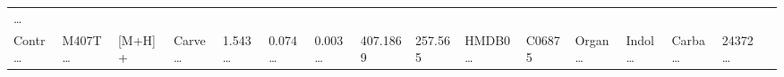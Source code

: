 \documentclass[
]{article}
\begin{document}
\begin{longtable}[]{@{}llllllllllllllll@{}}
\begin{minipage}[t]{0.02\columnwidth}
\ldots{}\strut
\end{minipage}\tabularnewline
\begin{minipage}[t]{0.04\columnwidth}\raggedright
Contr\ldots{}\strut
\end{minipage} & \begin{minipage}[t]{0.04\columnwidth}\raggedright
M407T\ldots{}\strut
\end{minipage} & \begin{minipage}[t]{0.04\columnwidth}\raggedright
{[}M+H{]}+\strut
\end{minipage} & \begin{minipage}[t]{0.04\columnwidth}\raggedright
Carve\ldots{}\strut
\end{minipage} & \begin{minipage}[t]{0.04\columnwidth}\raggedright
1.543\ldots{}\strut
\end{minipage} & \begin{minipage}[t]{0.04\columnwidth}\raggedright
0.074\ldots{}\strut
\end{minipage} & \begin{minipage}[t]{0.04\columnwidth}\raggedright
0.003\ldots{}\strut
\end{minipage} & \begin{minipage}[t]{0.04\columnwidth}\raggedright
407.1869\strut
\end{minipage} & \begin{minipage}[t]{0.04\columnwidth}\raggedright
257.565\strut
\end{minipage} & \begin{minipage}[t]{0.04\columnwidth}\raggedright
HMDB0\ldots{}\strut
\end{minipage} & \begin{minipage}[t]{0.03\columnwidth}\raggedright
C06875\strut
\end{minipage} & \begin{minipage}[t]{0.04\columnwidth}\raggedright
Organ\ldots{}\strut
\end{minipage} & \begin{minipage}[t]{0.04\columnwidth}\raggedright
Indol\ldots{}\strut
\end{minipage} & \begin{minipage}[t]{0.04\columnwidth}\raggedright
Carba\ldots{}\strut
\end{minipage} & \begin{minipage}[t]{0.04\columnwidth}\raggedright
24372\ldots{}\strut
\end{minipage} & \begin{minipage}[t]{0.02\columnwidth}\raggedright

\end{minipage}
\end{longtable}
\end{document}
